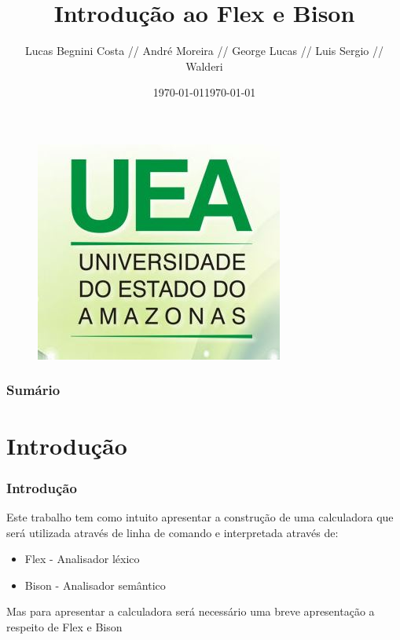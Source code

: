 \documentclass{beamer}
\title[Introdução ao Flex e Bison]{Introdução ao Flex e Bison}
\author[Lucas, André, George, Luis, Walderi]
       {Lucas Begnini Costa // André Moreira // George Lucas // Luis Sergio // Walderi}
\institute[UEA]{Universidade do Estado do Amazonas}
\date{\today}
\begin{document}

\begin{frame}[plain] %
    \titlepage   	%
	
            \begin{figure} 	%
            \centering		%
            \includegraphics[scale=0.41]{simbolouea} %
            \end{figure}
	\date{\today}  		%
\end{frame}			%

\frame{\titlepage}



\begin{frame}
  \frametitle{Sumário}		%
  \tableofcontents		%
\end{frame}			%


\section{Introdução}		%
\begin{frame} 			%
\frametitle{Introdução}
  Este trabalho tem como intuito apresentar a construção de uma calculadora	%
 que será utilizada através de linha de comando e interpretada através de:	%
 
    \begin{itemize} 				%
     \item<1-> Flex - Analisador léxico    	%
     \item<2-> Bison - Analisador semântico	 %
    \end{itemize}				%
  Mas para apresentar a calculadora será necessário uma breve apresentação a respeito de
 Flex e Bison

\end{frame}			%
\end{document}
